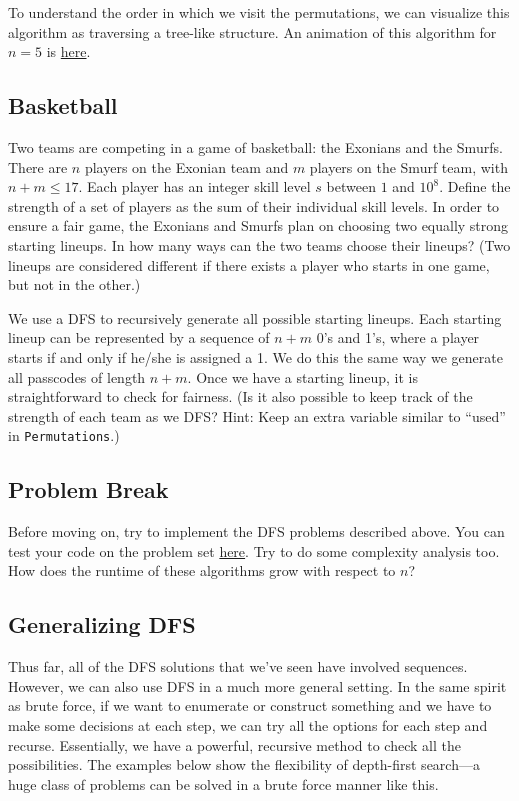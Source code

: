 To understand the order in which we visit the permutations, we can visualize this algorithm as traversing a tree-like structure. An animation of this algorithm for $n = 5$ is \href{http://dabbler0.github.io/ecc-animations/dfs.html}{here}.

\subsection{Basketball}

\begin{typewriter}
Two teams are competing in a game of basketball: the Exonians and the Smurfs. There are $n$ players on the Exonian team and $m$ players on the Smurf team, with $n + m \le 17$. Each player has an integer skill level $s$ between $1$ and $10^8$. Define the strength of a set of players as the sum of their individual skill levels. In order to ensure a fair game, the Exonians and Smurfs plan on choosing two equally strong starting lineups. In how many ways can the two teams choose their lineups? (Two lineups are considered different if there exists a player who starts in one game, but not in the other.)
\end{typewriter}

We use a DFS to recursively generate all possible starting lineups. Each starting lineup can be represented by a sequence of $n + m$ 0's and 1's, where a player starts if and only if he/she is assigned a 1. We do this the same way we generate all passcodes of length $n + m$. Once we have a starting lineup, it is straightforward to check for fairness. (Is it also possible to keep track of the strength of each team as we DFS? Hint: Keep an extra variable similar to ``used'' in \texttt{Permutations}.)

\subsection{Problem Break}

Before moving on, try to implement the DFS problems described above. You can test your code on the problem set \href{http://codeforces.com/group/iMPx86rZXm/contest/205012}{here}. Try to do some complexity analysis too. How does the runtime of these algorithms grow with respect to $n$?

\subsection{Generalizing DFS}

Thus far, all of the DFS solutions that we've seen have involved sequences. However, we can also use DFS in a much more general setting. In the same spirit as brute force, if we want to enumerate or construct something and we have to make some decisions at each step, we can try all the options for each step and recurse. Essentially, we have a powerful, recursive method to check all the possibilities. The examples below show the flexibility of depth-first search---a huge class of problems can be solved in a brute force manner like this.

